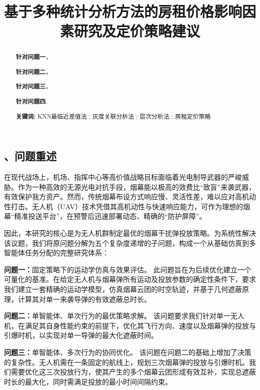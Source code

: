 \documentclass[12pt]{article}
\title{ \textbf{基于多种统计分析方法的房租价格影响因素研究及定价策略建议}}
\date{}
\begin{document}
\begin{CJK}{UTF8}{gbsn}
	
	\maketitle  %
	
	\setcounter{page}{1}
	
	\vspace{-7em}
	\begin{abstract}  %
		\vspace{1em}
		
		
		\textbf{针对问题一}，
		
		\textbf{针对问题二}，
		
		\textbf{针对问题三}，
		
		\textbf{针对问题四},
		
		\noindent\textbf{关键词:} KNN最临近差值法 ; 灰度关联分析法 ; 层次分析法 ; 房租定价策略
		
		
	\end{abstract}
	
	\newpage
	
	\section{、问题重述}

	
	在现代战场上，机场、指挥中心等高价值战略目标面临着光电制导武器的严峻威胁。作为一种高效的无源光电对抗手段，烟幕能以极高的效费比“致盲”来袭武器，有效保护我方资产。然而，传统烟幕布设方式响应慢、灵活性差，难以应对高机动性打击。无人机（UAV）技术凭借其高机动性与快速响应能力，可作为理想的烟幕“精准投送平台”，在预警后迅速部署动态、精确的“防护屏障”。
	
	因此，本研究的核心是为无人机群制定最优的烟幕干扰弹投放策略。为系统性解决该议题，我们将原问题分解为五个复杂度递增的子问题，构成一个从基础仿真到多智能体任务分配的完整研究体系：
	
	\textbf{问题一：}固定策略下的运动学仿真与效果评估。
	此问题旨在为后续优化建立一个可量化的基准。在给定无人机与烟幕弹所有运动及投放参数的确定性条件下，要求我们建立一套精确的运动学模型，仿真烟幕云团的时空轨迹，并基于几何遮蔽原理，计算其对单一来袭导弹的有效遮蔽总时长。
	
	\textbf{问题二：}单智能体、单次行为的最优策略求解。
	该问题要求我们针对单一无人机，在满足其自身性能约束的前提下，优化其飞行方向、速度以及烟幕弹的投放与引爆时机，以实现对单一导弹的最大化遮蔽时间。
	
	\textbf{问题三：}单智能体、多次行为的协同优化。
	该问题在问题二的基础上增加了决策的复杂性。无人机需在一条固定的航线上，规划三次烟幕弹的投放与引爆时机。我们需要优化这三次投放行为，使其产生的多个烟幕云团形成有效互补，实现总遮蔽时长的最大化，同时需满足投放的最小时间间隔约束。
	

\end{CJK}
\end{document}
